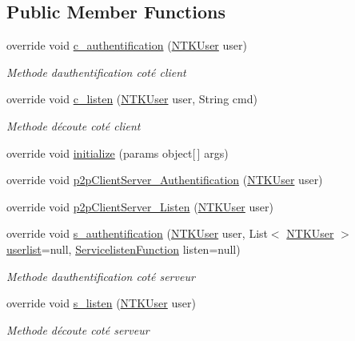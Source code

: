 \subsection*{Public Member Functions}
\begin{DoxyCompactItemize}
\item 
override void \mbox{\hyperlink{class_n_t_k_1_1_service_1_1_n_t_k_s___p2_p_base_server_a7a8a841137b8fcce5cf7c1f122d732f5}{c\+\_\+authentification}} (\mbox{\hyperlink{class_n_t_k_1_1_n_t_k_user}{N\+T\+K\+User}} user)
\begin{DoxyCompactList}\small\item\em Methode d\textquotesingle{}authentification coté client \end{DoxyCompactList}\item 
override void \mbox{\hyperlink{class_n_t_k_1_1_service_1_1_n_t_k_s___p2_p_base_server_a0e5648a55fed5c3b8acd1d3cb14151f8}{c\+\_\+listen}} (\mbox{\hyperlink{class_n_t_k_1_1_n_t_k_user}{N\+T\+K\+User}} user, String cmd)
\begin{DoxyCompactList}\small\item\em Methode d\textquotesingle{}écoute coté client \end{DoxyCompactList}\item 
override void \mbox{\hyperlink{class_n_t_k_1_1_service_1_1_n_t_k_s___p2_p_base_server_af71b704f97741b82231486559af122a7}{initialize}} (params object\mbox{[}$\,$\mbox{]} args)
\item 
override void \mbox{\hyperlink{class_n_t_k_1_1_service_1_1_n_t_k_s___p2_p_base_server_aeed4f0e761b2b5366b1c5c5595941a26}{p2p\+Client\+Server\+\_\+\+Authentification}} (\mbox{\hyperlink{class_n_t_k_1_1_n_t_k_user}{N\+T\+K\+User}} user)
\item 
override void \mbox{\hyperlink{class_n_t_k_1_1_service_1_1_n_t_k_s___p2_p_base_server_a328bbae01750cee242ecf00a4d0db350}{p2p\+Client\+Server\+\_\+\+Listen}} (\mbox{\hyperlink{class_n_t_k_1_1_n_t_k_user}{N\+T\+K\+User}} user)
\item 
override void \mbox{\hyperlink{class_n_t_k_1_1_service_1_1_n_t_k_s___p2_p_base_server_ad61965728ce6c47519899ec5b3c2cadf}{s\+\_\+authentification}} (\mbox{\hyperlink{class_n_t_k_1_1_n_t_k_user}{N\+T\+K\+User}} user, List$<$ \mbox{\hyperlink{class_n_t_k_1_1_n_t_k_user}{N\+T\+K\+User}} $>$ \mbox{\hyperlink{class_n_t_k_1_1_service_1_1_n_t_k_service_a14977c798a805fea99802fa40da31aa0}{userlist}}=null, \mbox{\hyperlink{namespace_n_t_k_1_1_service_a49f4581ae6fb3e9c155d034c47791db9}{Servicelisten\+Function}} listen=null)
\begin{DoxyCompactList}\small\item\em Methode d\textquotesingle{}authentification coté serveur \end{DoxyCompactList}\item 
override void \mbox{\hyperlink{class_n_t_k_1_1_service_1_1_n_t_k_s___p2_p_base_server_a29d92f2728d0f824d443114a9b3715ba}{s\+\_\+listen}} (\mbox{\hyperlink{class_n_t_k_1_1_n_t_k_user}{N\+T\+K\+User}} user)
\begin{DoxyCompactList}\small\item\em Methode d\textquotesingle{}écoute coté serveur \end{DoxyCompactList}\end{DoxyCompactItemize}
